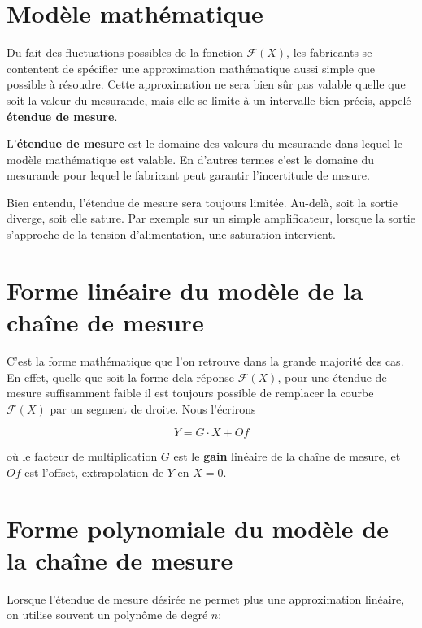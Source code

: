 \documentclass[main.tex]{subfiles}
\begin{document}
\section{Modèle mathématique}

Du fait des fluctuations possibles de la fonction $\mathcal{F}(X)$, les fabricants se contentent de spécifier une approximation mathématique aussi simple que possible à résoudre. Cette approximation ne sera bien sûr pas valable quelle que soit la valeur du mesurande, mais elle se limite à un intervalle bien précis, appelé \textbf{étendue de mesure}.

\begin{definition}
    L'\textbf{étendue de mesure} est le domaine des valeurs du mesurande dans lequel le modèle mathématique est valable. En d'autres termes c'est le domaine du mesurande pour lequel le fabricant peut garantir l'incertitude de mesure.
\end{definition}

Bien entendu, l'étendue de mesure sera toujours limitée. Au-delà, soit la sortie diverge, soit elle sature. Par exemple sur un simple amplificateur, lorsque la sortie s'approche de la tension d'alimentation, une saturation intervient.

\section{Forme linéaire du modèle de la chaîne de mesure}

C'est la forme mathématique que l'on retrouve dans la grande majorité des cas. En effet, quelle que soit la forme dela réponse $\mathcal{F}(X)$, pour une étendue de mesure suffisamment faible il est toujours possible de remplacer la courbe $\mathcal{F}(X)$ par un segment de droite. Nous l'écrirons

\begin{equation}
    Y = G\cdot X + Of
\end{equation}

où le facteur de multiplication $G$ est le \textbf{gain} linéaire de la chaîne de mesure, et $Of$ est l'offset, extrapolation de $Y$ en $X=0$.

\section{Forme polynomiale du modèle de la chaîne de mesure}

Lorsque l'étendue de mesure désirée ne permet plus une approximation linéaire, on utilise souvent un polynôme de degré $n$:
\end{document}
